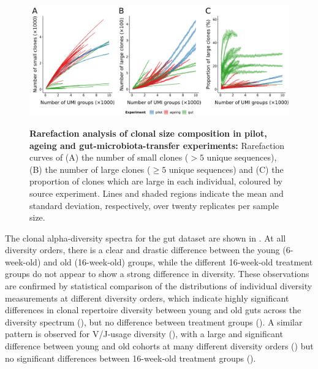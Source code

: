 \begin{figure}
\centering
\includegraphics[width = \textwidth]{_Figures/png/igseq-rarefied-clone-counts-size}
\begin{subfigure}{0em}
\label{fig:igseq-rarefied-clone-counts-small}
\end{subfigure}
\begin{subfigure}{0em}
\label{fig:igseq-rarefied-clone-counts-large}
\end{subfigure}
\begin{subfigure}{0em}
\label{fig:igseq-rarefied-clone-counts-large-pc}
\end{subfigure}
\caption[Rarefaction analysis of clonal size composition in \igseq pilot, ageing and gut-microbiota-transfer experiments]{\textbf{Rarefaction analysis of clonal size composition in \igseq pilot, ageing and gut-microbiota-transfer experiments:} Rarefaction curves of (A) the number of small clones ($>5$ unique sequences), (B) the number of large clones ($\geq 5$ unique sequences) and (C) the proportion of clones which are large in each individual, coloured by source experiment. Lines and shaded regions indicate the mean and standard deviation, respectively, over twenty replicates per sample size.}
\label{fig:igseq-rarefied-clone-counts-size}
\end{figure}

The clonal alpha-diversity spectra for the gut dataset are shown in . At all diversity orders, there is a clear and drastic difference between the young (6-week-old) and old (16-week-old) groups, while the different 16-week-old treatment groups do not appear to show a strong difference in diversity. These observations are confirmed by statistical comparison of the distributions of individual diversity measurements at different diversity orders, which indicate highly significant differences in clonal repertoire diversity between young and old guts across the diversity spectrum (), but no difference between treatment groups (). A similar pattern is observed for V/J-usage diversity (), with a large and significant difference between young and old cohorts at many different diversity orders () but no significant differences between 16-week-old treatment groups ().

